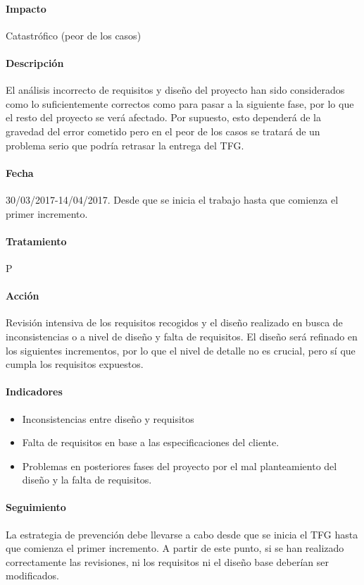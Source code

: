 \documentclass[10pt,a4paper]{article}
\begin{document}
				\paragraph{Impacto}	Catastrófico (peor de los casos)
				\paragraph{Descripción} El análisis incorrecto de requisitos y diseño del proyecto han sido considerados como lo suficientemente correctos como para pasar a la siguiente fase, por lo que el resto del proyecto se verá afectado. Por supuesto, esto dependerá de la gravedad del error cometido pero en el peor de los casos se tratará de un problema serio que podría retrasar la entrega del TFG.
				\paragraph{Fecha} 30/03/2017-14/04/2017. Desde que se inicia el trabajo hasta que comienza el primer incremento.
				\paragraph{Tratamiento} P
				\paragraph{Acción} Revisión intensiva de los requisitos recogidos y el diseño realizado en busca de inconsistencias o a nivel de diseño y falta de requisitos. El diseño será refinado en los siguientes incrementos, por lo que el nivel de detalle no es crucial, pero sí que cumpla los requisitos expuestos.
				\paragraph{Indicadores} 
				    \begin{itemize}
				        \item Inconsistencias entre diseño y requisitos
				        \item Falta de requisitos en base a las especificaciones del cliente.
				        \item Problemas en posteriores fases del proyecto por el mal planteamiento del diseño y la falta de requisitos.
				    \end{itemize}
				\paragraph{Seguimiento}	La estrategia de prevención debe llevarse a cabo desde que se inicia el TFG hasta que comienza el primer incremento. A partir de este punto, si se han realizado correctamente las revisiones, ni los requisitos ni el diseño base deberían ser modificados. 
\end{document}
